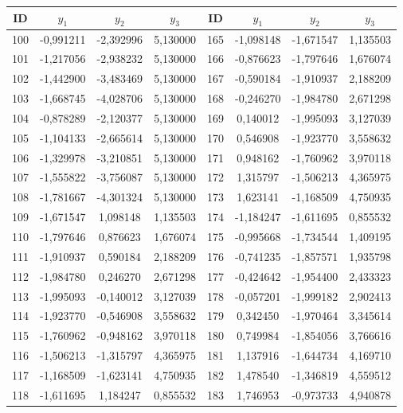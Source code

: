 \begin{apendicesenv}
\begin{table}[H]
	\centering
	\scriptsize
	\begin{tabular}{c c c c c c c c}
		\toprule
		 \centering \textbf{ID} & $y_1$ & $y_2$ & $y_3$ & \textbf{ID} & $y_1$ & $y_2$ & $y_3$ \\
		\midrule
		100 & -0,991211 & -2,392996 & 5,130000 & 165 & -1,098148 & -1,671547 & 1,135503 \\
		101 & -1,217056 & -2,938232 & 5,130000 & 166 & -0,876623 & -1,797646 & 1,676074 \\
		102 & -1,442900 & -3,483469 & 5,130000 & 167 & -0,590184 & -1,910937 & 2,188209 \\
		103 & -1,668745 & -4,028706 & 5,130000 & 168 & -0,246270 & -1,984780 & 2,671298 \\
		104 & -0,878289 & -2,120377 & 5,130000 & 169 & 0,140012 & -1,995093 & 3,127039 \\
		105 & -1,104133 & -2,665614 & 5,130000 & 170 & 0,546908 & -1,923770 & 3,558632 \\
		106 & -1,329978 & -3,210851 & 5,130000 & 171 & 0,948162 & -1,760962 & 3,970118 \\
		107 & -1,555822 & -3,756087 & 5,130000 & 172 & 1,315797 & -1,506213 & 4,365975 \\
		108 & -1,781667 & -4,301324 & 5,130000 & 173 & 1,623141 & -1,168509 & 4,750935 \\
		109 & -1,671547 & 1,098148 & 1,135503 & 174 & -1,184247 & -1,611695 & 0,855532 \\
		110 & -1,797646 & 0,876623 & 1,676074 & 175 & -0,995668 & -1,734544 & 1,409195 \\
		111 & -1,910937 & 0,590184 & 2,188209 & 176 & -0,741235 & -1,857571 & 1,935798 \\
		112 & -1,984780 & 0,246270 & 2,671298 & 177 & -0,424642 & -1,954400 & 2,433323 \\
		113 & -1,995093 & -0,140012 & 3,127039 & 178 & -0,057201 & -1,999182 & 2,902413 \\
		114 & -1,923770 & -0,546908 & 3,558632 & 179 & 0,342450 & -1,970464 & 3,345614 \\
		115 & -1,760962 & -0,948162 & 3,970118 & 180 & 0,749984 & -1,854056 & 3,766616 \\
		116 & -1,506213 & -1,315797 & 4,365975 & 181 & 1,137916 & -1,644734 & 4,169710 \\
		117 & -1,168509 & -1,623141 & 4,750935 & 182 & 1,478540 & -1,346819 & 4,559512 \\
		118 & -1,611695 & 1,184247 & 0,855532 & 183 & 1,746953 & -0,973733 & 4,940878 \\

\end{tabular}
\end{table}
\end{apendicesenv}
